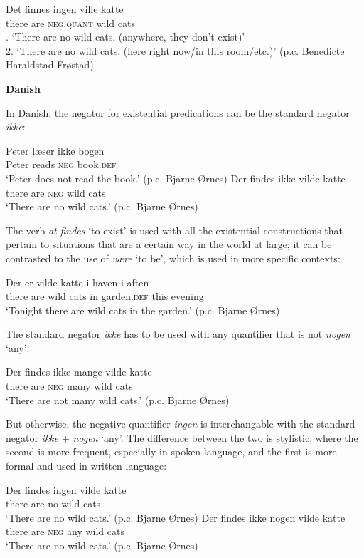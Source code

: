 \documentclass[output=paper]{langsci/langscibook}
\begin{document}
\begin{unindented}
\begin{exe}\ex\gll  Det   finnes ingen ville katte\\
there are \textsc{neg.quant}  wild cats\\
. `There are no wild cats. (anywhere, they don't exist)’\\
2. `There are no wild cats. (here right now/in this room/etc.)' (p.c. Benedicte Haraldstad Frøstad)
\end{exe}

\textbf{Danish}

In Danish, the negator for existential predications can be the standard negator \textit{ikke}:
%
\begin{exe}\ex \gll Peter læser ikke bogen \\
Peter reads  \textsc{neg} book.\textsc{def} \\
    \glt `Peter does not read the book.' (p.c. Bjarne Ørnes)
\ex \gll Der findes ikke vilde katte \\
there are \textsc{neg} wild cats \\
    \glt `There are no wild cats.' (p.c. Bjarne Ørnes)
    \end{exe}

The verb \textit{at} \textit{findes} `to exist' is used with all the existential constructions that pertain to situations that are a certain way in the world at large; it can be contrasted to the use of \textit{være} `to be', which is used in more specific contexts:
%
\begin{exe}\ex \gll Der er vilde katte i haven i aften \\
there are wild cats in garden.\textsc{def} this evening \\
    \glt `Tonight there are wild cats in the garden.' (p.c. Bjarne Ørnes)
    \end{exe}

The standard negator \textit{ikke} has to be used with any quantifier that is not \textit{nogen} `any':
%
\begin{exe}\ex \gll Der findes ikke mange vilde katte \\
there are \textsc{neg}  many   wild cats \\
    \glt `There are not many wild cats.' (p.c. Bjarne Ørnes)
    \end{exe}

But otherwise, the negative quantifier \textit{ingen} is interchangable with the standard negator \textit{ikke} + \textit{nogen} `any'. The difference between the two is stylistic, where the second is more frequent, especially in spoken language, and the first is more formal and used in written language:
%
\begin{exe}\ex \gll Der   findes ingen vilde katte \\
there are no     wild cats \\
    \glt `There are no wild cats.' (p.c. Bjarne Ørnes)
\ex \gll Der   findes ikke nogen vilde katte \\
there are \textsc{neg}  any  wild cats \\
    \glt `There are no wild cats.' (p.c. Bjarne Ørnes)
    \end{exe}


\end{unindented}
\end{document}
